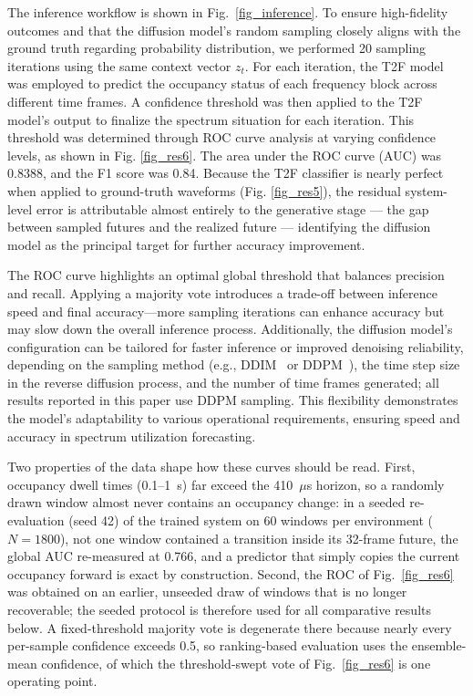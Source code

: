 \documentclass[lettersize,journal]{IEEEtran}
\begin{document}
The inference workflow is shown in Fig.~\ref{fig_inference}. To ensure high-fidelity outcomes and that the diffusion model's random sampling closely aligns with the ground truth regarding probability distribution, we performed 20 sampling iterations using the same context vector $z_t$. For each iteration, the T2F model was employed to predict the occupancy status of each frequency block across different time frames. A confidence threshold was then applied to the T2F model's output to finalize the spectrum situation for each iteration. This threshold was determined through ROC curve analysis at varying confidence levels, as shown in Fig. \ref{fig_res6}. The area under the ROC curve (AUC) was 0.8388, and the F1 score was 0.84. Because the T2F classifier is nearly perfect when applied to ground-truth waveforms (Fig. \ref{fig_res5}), the residual system-level error is attributable almost entirely to the generative stage — the gap between sampled futures and the realized future — identifying the diffusion model as the principal target for further accuracy improvement.

The ROC curve highlights an optimal global threshold that balances precision and recall. Applying a majority vote introduces a trade-off between inference speed and final accuracy—more sampling iterations can enhance accuracy but may slow down the overall inference process. Additionally, the diffusion model's configuration can be tailored for faster inference or improved denoising reliability, depending on the sampling method (e.g., DDIM~\cite{Song2021DDIM} or DDPM~\cite{Ho2020DDPM}), the time step size in the reverse diffusion process, and the number of time frames generated; all results reported in this paper use DDPM sampling. This flexibility demonstrates the model's adaptability to various operational requirements, ensuring speed and accuracy in spectrum utilization forecasting.

Two properties of the data shape how these curves should be read. First, occupancy dwell times (0.1--1~s) far exceed the 410~$\mu$s horizon, so a randomly drawn window almost never contains an occupancy change: in a seeded re-evaluation (seed 42) of the trained system on 60 windows per environment ($N{=}1800$), not one window contained a transition inside its 32-frame future, the global AUC re-measured at 0.766, and a predictor that simply copies the current occupancy forward is exact by construction. Second, the ROC of Fig.~\ref{fig_res6} was obtained on an earlier, unseeded draw of windows that is no longer recoverable; the seeded protocol is therefore used for all comparative results below. A fixed-threshold majority vote is degenerate there because nearly every per-sample confidence exceeds 0.5, so ranking-based evaluation uses the ensemble-mean confidence, of which the threshold-swept vote of Fig.~\ref{fig_res6} is one operating point.
\end{document}
